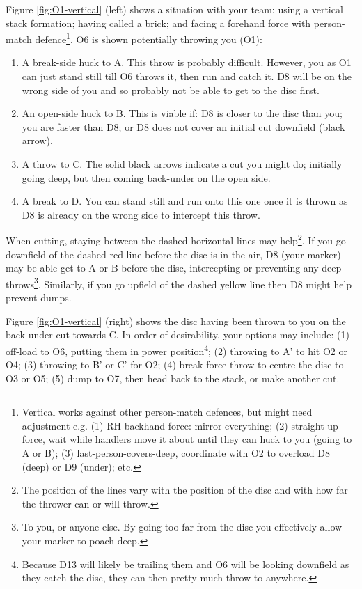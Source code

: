 \documentclass{tufte-handout}
\begin{document}
Figure \ref{fig:O1-vertical} (left) shows 
a situation 
with 
your team: 
using 
a vertical stack formation; 
having called a brick; and
facing a 
forehand force with 
person-match defence\footnote{
Vertical works
against other person-match defences, 
but might need 
adjustment e.g. 
(1) RH-backhand-force: mirror everything;
(2) straight up force, 
wait while handlers 
move it about 
until they can huck 
to you (going to A or B);
(3) last-person-covers-deep,
coordinate with O2 
to overload D8 (deep) 
or D9 (under); etc.}. 
O6 is shown
potentially throwing 
you (O1):
\begin{enumerate}
\item A break-side 
huck to A.
This throw is 
probably 
difficult. 
However, you as O1
can just
stand still 
till O6 throws it, 
then run and catch it.
D8 will be on the wrong side of you
and so probably 
not be able 
to get to the disc
first.
\item An open-side huck to B. 
This is viable if: 
D8 is closer to the disc than you; 
you are faster than D8; or 
D8 does not cover 
an initial cut downfield (black arrow). 
\item A throw 
to C.
The solid black arrows indicate 
a cut you might do;
initially going deep,
but then coming back-under
on the open side. 
\item A break to D. 
You can stand still 
and run onto this one 
once it is thrown 
as D8 is already on 
the wrong side to intercept 
this throw. 
\end{enumerate}
When cutting,
staying  
between 
the dashed 
horizontal 
lines 
may help\footnote{ 
The position of 
the lines vary
with the position of the disc
and with how far the thrower  
can or will 
throw.}. 
If you go 
downfield of the dashed red line 
before the disc is in the air,
D8 (your marker) 
may be able 
get to
A or B 
before the disc,
intercepting 
or preventing
any deep throws\footnote{
To you, 
or anyone else.
By going 
too far 
from the disc 
you 
effectively
allow your marker 
to poach deep.}.
Similarly, 
if you go 
upfield of the dashed yellow line
then D8 
might help
prevent dumps.

Figure \ref{fig:O1-vertical} (right) shows 
the disc having been thrown to you
on the back-under cut towards C. 
In order of desirability, 
your options may include: 
(1)
off-load to O6, 
putting them in power position\footnote{
Because D13 
will likely be trailing them 
and O6 
will be looking downfield 
as they catch the disc, 
they can
then pretty much 
throw to anywhere.};
(2) throwing to A' to hit O2 or O4;
(3) throwing to B' or C' for O2;
(4) break force throw 
to centre the disc
to O3 or O5;
(5) dump to O7, then
head back to the stack, 
or make another cut.
\end{document}
